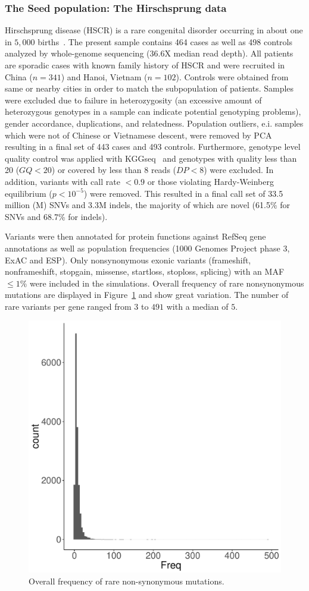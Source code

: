\subsubsection{The Seed population: The Hirschsprung data}
\label{ssub:The_Seed_population:_The_Hirschsprung_data}
Hirschsprung disease (HSCR) is a rare congenital disorder occurring in about one in $5,000$ births~\cite{Amiel2001}.
The present sample contains 464 cases as well as 498 controls analyzed by whole-genome sequencing (36.6X median read depth).
All patients are sporadic cases with known family history of HSCR and were recruited in China ($n=341$) and Hanoi, Vietnam ($n=102$).
Controls were obtained from same or nearby cities in order to match the subpopulation of patients.
Samples were excluded due to failure in heterozygosity (an excessive amount of heterozygous genotypes in a sample can indicate potential genotyping problems), gender accordance, duplications, and relatedness.
Population outliers, e.i. samples which were not of Chinese or Vietnamese descent, were removed by PCA resulting in a final set of 443 cases and 493 controls.
Furthermore, genotype level quality control was applied with KGGseq~\cite{Li2012b} and genotypes with quality less than 20 ($GQ<20$) or covered by less than 8 reads ($DP<8$) were excluded.
In addition, variants with call rate $<0.9$ or those violating Hardy-Weinberg equilibrium ($p<10^{-5}$) were removed.
This resulted in a final call set of 33.5 million (M) SNVs and 3.3M indels, the majority of which are novel (61.5\% for SNVs and 68.7\% for indels). 

Variants were then annotated for protein functions against RefSeq gene annotations as well as population frequencies (1000 Genomes Project phase 3, ExAC and ESP).
Only nonsynonymous exonic variants (frameshift, nonframeshift, stopgain, missense, startloss, stoploss, splicing) with an MAF $\leq 1\%$ were included in the simulations. 
Overall frequency of rare nonsynonymous mutations are displayed in Figure~\ref{fig:num_var} and show great variation.
The number of rare variants per gene ranged from $3$ to $491$ with a median of $5$.

\begin{figure}[htpb]
  \centering
  \includegraphics[width=0.5\linewidth]{ksburden/figures/number_var_genes.pdf}
  \caption[Frequency of rare variants]{Overall frequency of rare non-synonymous mutations.}\label{fig:num_var}
\end{figure}

